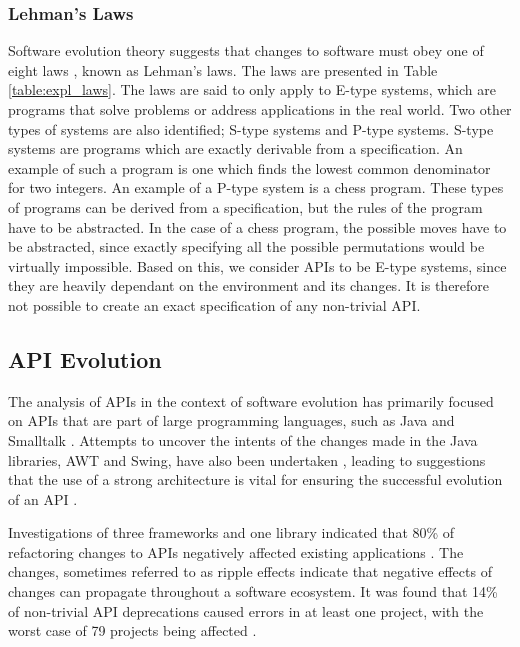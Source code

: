 \documentclass{sig-alternate}
\begin{document}
\subsubsection{Lehman’s Laws}
Software evolution theory suggests that changes to software must obey one of eight laws \cite{lehman90sview}, known as Lehman's laws. The laws are presented in Table \ref{table:expl_laws}. The laws are said to only apply to E-type systems, which are programs that solve problems or address applications in the real world. Two other types of systems are also identified; S-type systems and P-type systems. S-type systems are programs which are exactly derivable from a specification. An example of such a program is one which finds the lowest common denominator for two integers. An example of a P-type system is a chess program. These types of programs can be derived from a specification, but the rules of the program have to be abstracted. In the case of a chess program, the possible moves have to be abstracted, since exactly specifying all the possible permutations would be virtually impossible. Based on this, we consider APIs to be E-type systems, since they are heavily dependant on the environment and its changes. It is therefore not possible to create an exact specification of any non-trivial API. 





\subsection{API Evolution} \label{related_work}
The analysis of APIs in the context of software evolution has primarily focused on APIs that are part of large programming languages, such as Java \cite{hou2011exploring, shi2011empirical} and Smalltalk \cite{robbes2012developers}. Attempts to uncover the intents of the changes made in the Java libraries, AWT and Swing, have also been undertaken \cite{hou2011exploring}, leading to suggestions that the use of a strong architecture is vital for ensuring the successful evolution of an API \cite{hou2011exploring}.


Investigations of three frameworks and one library indicated that 80\% of refactoring changes to APIs negatively affected existing applications \cite{dig2005role}. The changes, sometimes referred to as ripple effects \cite{robbes2012developers} indicate that negative effects of changes can propagate throughout a software ecosystem. It was found that 14\% of non-trivial API deprecations caused errors in at least one project, with the worst case of 79 projects being affected \cite{robbes2012developers}.
\end{document}
